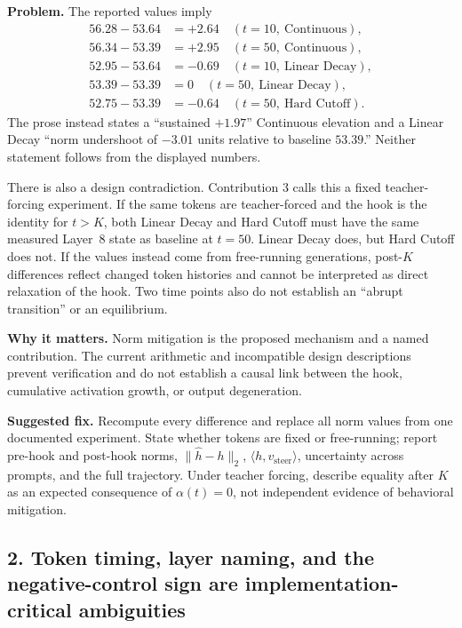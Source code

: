 \documentclass[11pt]{article}
\begin{document}
\textbf{Problem.} The reported values imply
\begin{align*}
56.28-53.64 &= +2.64 \quad (t=10,\ \text{Continuous}),\\
56.34-53.39 &= +2.95 \quad (t=50,\ \text{Continuous}),\\
52.95-53.64 &= -0.69 \quad (t=10,\ \text{Linear Decay}),\\
53.39-53.39 &= 0 \quad (t=50,\ \text{Linear Decay}),\\
52.75-53.39 &= -0.64 \quad (t=50,\ \text{Hard Cutoff}).
\end{align*}
The prose instead states a ``sustained $+1.97$'' Continuous elevation and a Linear Decay ``norm undershoot of $-3.01$ units relative to baseline $53.39$.''  Neither statement follows from the displayed numbers.

There is also a design contradiction.  Contribution 3 calls this a fixed teacher-forcing experiment.  If the same tokens are teacher-forced and the hook is the identity for $t>K$, both Linear Decay and Hard Cutoff must have the same measured Layer~8 state as baseline at $t=50$.  Linear Decay does, but Hard Cutoff does not.  If the values instead come from free-running generations, post-$K$ differences reflect changed token histories and cannot be interpreted as direct relaxation of the hook.  Two time points also do not establish an ``abrupt transition'' or an equilibrium.

\textbf{Why it matters.} Norm mitigation is the proposed mechanism and a named contribution.  The current arithmetic and incompatible design descriptions prevent verification and do not establish a causal link between the hook, cumulative activation growth, or output degeneration.

\textbf{Suggested fix.} Recompute every difference and replace all norm values from one documented experiment.  State whether tokens are fixed or free-running; report pre-hook and post-hook norms, $\|\hat h-h\|_2$, $\langle h,v_{\text{steer}}\rangle$, uncertainty across prompts, and the full trajectory.  Under teacher forcing, describe equality after $K$ as an expected consequence of $\alpha(t)=0$, not independent evidence of behavioral mitigation.

\subsection*{2. Token timing, layer naming, and the negative-control sign are implementation-critical ambiguities}
\end{document}
